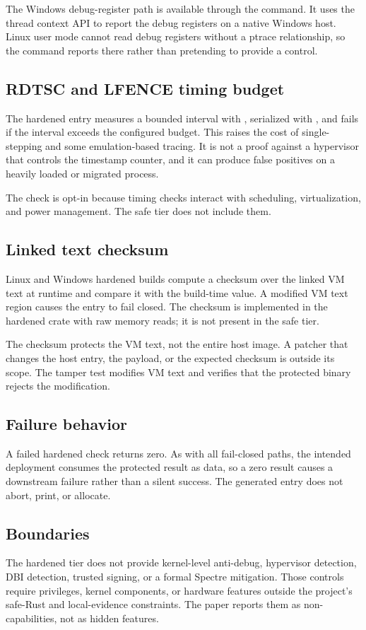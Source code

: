 The Windows debug-register path is available through the 
command. It uses the thread context API to report the debug registers on a native
Windows host. Linux user mode cannot read debug registers without a ptrace
relationship, so the command reports  there rather than
pretending to provide a control.

\subsection{RDTSC and LFENCE timing budget}

The hardened entry measures a bounded interval with , serialized with
, and fails if the interval exceeds the configured budget. This
raises the cost of single-stepping and some emulation-based tracing. It is not a
proof against a hypervisor that controls the timestamp counter, and it can
produce false positives on a heavily loaded or migrated process.

The check is opt-in because timing checks interact with scheduling, virtualization,
and power management. The safe tier does not include them.

\subsection{Linked text checksum}

Linux and Windows hardened builds compute a checksum over the linked VM text at
runtime and compare it with the build-time value. A modified VM text region
causes the entry to fail closed. The checksum is implemented in the hardened
crate with raw memory reads; it is not present in the safe tier.

The checksum protects the VM text, not the entire host image. A patcher that
changes the host entry, the payload, or the expected checksum is outside its
scope. The tamper test modifies VM text and verifies that the protected binary
rejects the modification.

\subsection{Failure behavior}

A failed hardened check returns zero. As with all fail-closed paths, the intended
deployment consumes the protected result as data, so a zero result causes a
downstream failure rather than a silent success. The generated entry does not
abort, print, or allocate.

\subsection{Boundaries}

The hardened tier does not provide kernel-level anti-debug, hypervisor detection,
DBI detection, trusted signing, or a formal Spectre mitigation. Those controls
require privileges, kernel components, or hardware features outside the project's
safe-Rust and local-evidence constraints. The paper reports them as
non-capabilities, not as hidden features.

